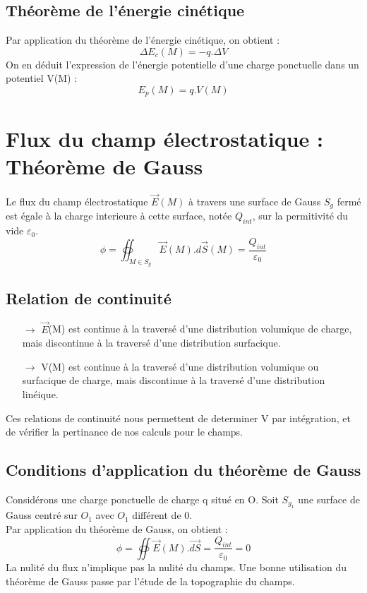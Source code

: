 \subsection{Théorème de l'énergie cinétique}
\begin{prop}
Par application du théorème de l'énergie cinétique, on obtient : 
$$\Delta E_c(M) = -q.\Delta V$$
On en déduit l'expression de l'énergie potentielle d'une charge ponctuelle dans un potentiel V(M) : 
$$E_p(M) = q.V(M)$$
\end{prop}
\section{Flux du champ électrostatique : Théorème de Gauss}
\begin{theo}
Le flux du champ électrostatique $\overrightarrow{E}(M)$ à travers une surface de Gauss $S_g$ fermé est égale à la charge interieure à cette surface, notée $Q_{int}$, sur la permitivité du vide $\varepsilon_0$.
$$\phi = \oiint_{M \in S_g} \overrightarrow{E}(M).d\overrightarrow{S}(M) = \dfrac{Q_{int}}{\varepsilon_0}$$
\end{theo}
\subsection{Relation de continuité}
\begin{itemize}
 \item[$\rightarrow$] $\overrightarrow{E}$(M) est continue à la traversé d'une distribution volumique de charge, mais discontinue à la traversé d'une distribution surfacique.
 \item[$\rightarrow$] V(M) est continue à la traversé d'une distribution volumique ou surfacique de charge, mais discontinue à la traversé d'une distribution linéique.
\end{itemize}
Ces relations de continuité nous permettent de determiner V par intégration, et de vérifier la pertinance de nos calculs pour le champs.
\subsection{Conditions d'application du théorème de Gauss}
Considérons une charge ponctuelle de charge q situé en O. Soit $S_{g_1}$ une surface de Gauss centré sur $O_1$ avec $O_1$ différent de 0.\\
Par application du théorème de Gauss, on obtient : 
$$\phi = \oiint \overrightarrow{E}(M).\overrightarrow{dS} = \dfrac{Q_{int}}{\varepsilon_0} = 0$$
La nulité du flux n'implique pas la nulité du champs.
Une bonne utilisation du théorème de Gauss passe par l'étude de la topographie du champs.

